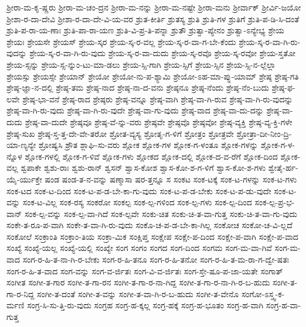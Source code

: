 {ಶ್ರೀರಾ-ಮ-ಕೃ-ಷ್ಣರು
ಶ್ರೀರಾ-ಮ-ಚಂ-ದ್ರನ
ಶ್ರೀರಾ-ಮ-ನನ್ನು
ಶ್ರೀರಾ-ಮ-ನಷ್ಟೇ
ಶ್ರೀರಾ-ಮನು
ಶ್ರೀರ್ವಾಕ್
ಶ್ರೀರ್ವಿ-ಜಯೋ
ಶ್ರೀಶಾ-ರ-ದಾ-ದೇವಿ
ಶ್ರೀಶಾ-ರ-ದಾ-ದೇ-ವಿ-ಯ-ವರ
ಶ್ರುತ-ಕೀರ್ತಿ
ಶ್ರುತಸ್ಯ
ಶ್ರುತಿ
ಶ್ರುತಿ-ಗಳ
ಶ್ರುತಿಗೆ
ಶ್ರುತಿ-ಪ-ಡಿ-ಸಿ-ದಂತೆ
ಶ್ರುತಿ-ಪ-ರಾ-ಯ-ಣಾಃ
ಶ್ರುತಿ-ಪಾ-ರಾ-ಯಣ
ಶ್ರುತಿ-ವಿ-ಪ್ರ-ತಿ-ಪನ್ನಾ
ಶ್ರುತೌ
ಶ್ರುತ್ವಾ-ಪ್ಯೇನಂ
ಶ್ರುತ್ವಾ-ಽನ್ಯೇಭ್ಯ
ಶ್ರೇಯ
ಶ್ರೇಯಃ
ಶ್ರೇಯಸೇ
ಶ್ರೇಯಸ್
ಶ್ರೇಯ-ಸ್ಕರ
ಶ್ರೇಯ-ಸ್ಕ-ರ-ವಲ್ಲ
ಶ್ರೇಯ-ಸ್ಕ-ರ-ವಾ-ಗ-ಬೇ-ಕೆಂದು
ಶ್ರೇಯ-ಸ್ಕ-ರ-ವಾ-ಗಿ-ರು-ವುದನ್ನು
ಶ್ರೇಯ-ಸ್ಕ-ರ-ವಾ-ಗಿ-ರು-ವುದು
ಶ್ರೇಯ-ಸ್ಕ-ರ-ವಾ-ದುದು
ಶ್ರೇಯ-ಸ್ಕ-ರವೊ
ಶ್ರೇಯ-ಸ್ಕ-ರವೋ
ಶ್ರೇಯ-ಸ್ತತೋ
ಶ್ರೇಯ-ಸ್ಸನ್ನು
ಶ್ರೇಯ-ಸ್ಸ-ನ್ನುಂ-ಟು-ಮಾ-ಡಲು
ಶ್ರೇಯ-ಸ್ಸಿ-ಗಾಗಿ
ಶ್ರೇಯ-ಸ್ಸಿಗೆ
ಶ್ರೇಯ-ಸ್ಸಿನ
ಶ್ರೇಯ-ಸ್ಸಿ-ನ-ಲ್ಲೆಲ್ಲಾ
ಶ್ರೇಯಸ್ಸು
ಶ್ರೇಯಸ್ಸೇ
ಶ್ರೇಯಾನ್
ಶ್ರೇಯೋ
ಶ್ರೇಯೋ-ನು-ಪ-ಶ್ಯಾಮಿ
ಶ್ರೇಯೋ-ಽಹ-ಮಾ-ಪ್ನು-ಯಾಮ್
ಶ್ರೇಷ್ಠ
ಶ್ರೇಷ್ಠ-ಗತಿ
ಶ್ರೇಷ್ಠ-ಜ್ಞಾ-ನ-ದಲ್ಲಿ
ಶ್ರೇಷ್ಠ-ತಮ
ಶ್ರೇಷ್ಠ-ನಾದ
ಶ್ರೇಷ್ಠ-ನಾ-ದ-ವನು
ಶ್ರೇಷ್ಠನೂ
ಶ್ರೇಷ್ಠ-ನೆಂದು
ಶ್ರೇಷ್ಠ-ನೆಂ-ಬುದು
ಶ್ರೇಷ್ಠ-ಫ-ಲವೇ
ಶ್ರೇಷ್ಠ-ಭಾ-ವನೆ
ಶ್ರೇಷ್ಠ-ರಾದ
ಶ್ರೇಷ್ಠರು
ಶ್ರೇಷ್ಠ-ವನ್ನೂ
ಶ್ರೇಷ್ಠ-ವಾಗಿ
ಶ್ರೇಷ್ಠ-ವಾ-ಗಿ-ರುವ
ಶ್ರೇಷ್ಠ-ವಾ-ಗಿ-ರು-ವುದನ್ನು
ಶ್ರೇಷ್ಠ-ವಾ-ಗಿ-ರು-ವುದು
ಶ್ರೇಷ್ಠ-ವಾ-ಗಿ-ರು-ವುದೇ
ಶ್ರೇಷ್ಠ-ವಾ-ಗು-ವುದು
ಶ್ರೇಷ್ಠ-ವಾದ
ಶ್ರೇಷ್ಠ-ವಾ-ದು-ದನ್ನು
ಶ್ರೇಷ್ಠ-ವಾ-ದುದು
ಶ್ರೇಷ್ಠ-ವಾ-ದುದೇ
ಶ್ರೇಷ್ಠವೂ
ಶ್ರೇಷ್ಠ-ವೆ-ನ್ನು-ವರು
ಶ್ರೇಷ್ಠವೇ
ಶ್ರೇಷ್ಠವೊ
ಶ್ರೇಷ್ಠವೋ
ಶ್ರೇಷ್ಠ-ವ್ಯಕ್ತಿ
ಶ್ರೇಷ್ಠ-ವ್ಯ-ಕ್ತಿ-ಗಳೇ
ಶ್ರೇಷ್ಠ-ಸುಖ
ಶ್ರೇಷ್ಠ-ಸ್ತ-ತ್ತ-ದೇ-ವೇ-ತರೋ
ಶ್ರೋತ-ವ್ಯಸ್ಯ
ಶ್ರೋತೃ-ಗ-ಳಿಗೆ
ಶ್ರೋತ್ರಂ
ಶ್ರೋತ್ರವೇ
ಶ್ರೋತ್ರಾ-ದೀ-ನೀಂ-ದ್ರಿ-ಯಾ-ಣ್ಯನ್ಯೇ
ಶ್ರೋಷ್ಯಸಿ
ಶ್ರೌತ
ಶ್ಲಾಘಿ-ಸು-ವರು
ಶ್ಲೋಕ
ಶ್ಲೋಕ-ಗಳ
ಶ್ಲೋಕ-ಗ-ಳಂತೂ
ಶ್ಲೋಕ-ಗಳನ್ನು
ಶ್ಲೋಕ-ಗ-ಳ-ನ್ನೊಳ
ಶ್ಲೋಕ-ಗಳಲ್ಲಿ
ಶ್ಲೋಕ-ಗ-ಳಿವೆ
ಶ್ಲೋಕ-ಗಳು
ಶ್ಲೋಕದ
ಶ್ಲೋಕ-ದಲ್ಲಿ
ಶ್ಲೋಕ-ದ-ವ-ರೆಗೆ
ಶ್ಲೋಕ-ದಿಂದ
ಶ್ಲೋಕ-ವಲ್ಲ
ಶ್ವಪಾಕೇ
ಶ್ವಶು-ರಾಃ
ಶ್ವಶು-ರಾನ್
ಶ್ವಸನ್
ಶ್ವಾಸ-ಕೋಶ
ಶ್ವಾಸ-ಕೋ-ಶ-ಗ-ಳಿಗೆ
ಶ್ವಾಸ-ಕೋ-ಶ-ಗಳು
ಶ್ವೇತೈ-ರ್ಹ-ಯೈ-ರ್ಯುಕ್ತೇ
ಷಂಡ
ಷಂಡ-ತ-ನ-ವನ್ನು
ಷಣ್ಮಾಸಾ
ಷರ-ತ್ತನ್ನೂ
ಸ
ಸಂಕಟ
ಸಂಕ-ಟಕ್ಕೆ
ಸಂಕ-ಟ-ಗಳನ್ನು
ಸಂಕ-ಟ-ಗಳು
ಸಂಕ-ಟದ
ಸಂಕ-ಟ-ದಿಂದ
ಸಂಕ-ಟ-ಪ-ಡ-ಬೇ-ಕಾ-ಗು-ವುದು
ಸಂಕ-ಟ-ಪ-ಡ-ಬೇಕು
ಸಂಕ-ಟ-ಪ-ಡು-ವುದೇ
ಸಂಕ-ಟ-ವನ್ನು
ಸಂಕ-ಟ-ವಿಲ್ಲ
ಸಂಕ-ರಸ್ಯ
ಸಂಕರೋ
ಸಂಕಲ್ಪ
ಸಂಕ-ಲ್ಪ-ಗಳಿಂದ
ಸಂಕ-ಲ್ಪ-ಗಳು
ಸಂಕ-ಲ್ಪ-ದಿಂದ
ಸಂಕ-ಲ್ಪ-ಪ್ರ-ಭ-ವಾನ್
ಸಂಕ-ಲ್ಪ-ವನ್ನು
ಸಂಕ-ಲ್ಪ-ವಾ-ಗಿದೆ
ಸಂಕ-ಲ್ಪವೇ
ಸಂಕು-ಚಿತ
ಸಂಕು-ಚಿ-ತ-ವಾ-ಗುತ್ತ
ಸಂಕು-ಚಿ-ತ-ವಾ-ಗು-ವುದು
ಸಂಕೇ-ತ-ರೂ-ಪ-ವಾಗಿ
ಸಂಕೇ-ತ-ವಾ-ಗಿ-ರು-ವುದು
ಸಂಕೊ-ಚ-ಪ-ಡ-ಬೇ-ಕಾ-ಗಿಲ್ಲ
ಸಂಕೋಚ
ಸಂಕೋ-ಚ-ವಿ-ಲ್ಲದೆ
ಸಂಕೋಲೆ
ಸಂಕ್ರಾಂತಿ
ಸಂಕ್ರಾಂ-ತಿಯ
ಸಂಕ್ರಾ-ಮಿಕ
ಸಂಕ್ಷಿಪ್ತ
ಸಂಕ್ಷೇಪ
ಸಂಕ್ಷೇ-ಪ-ದಿಂದ
ಸಂಕ್ಷೇ-ಪ-ವಾಗಿ
ಸಂಕ್ಷೇ-ಪ-ವಾದ
ಸಂಖ್ಯೆ
ಸಂಖ್ಯೆ-ಯಲ್ಲ
ಸಂಖ್ಯೆ-ಯಲ್ಲಿ
ಸಂಖ್ಯೇ
ಸಂಗ
ಸಂಗಂ
ಸಂಗದ
ಸಂಗ-ದಿಂದ
ಸಂಗಮ
ಸಂಗ-ಮ-ವಾ-ಗಿವೆ
ಸಂಗ-ಮ-ವಾದ
ಸಂಗ-ರ-ಹಿ-ತ-ನಾ-ಗಿ-ರ-ಬೇಕು
ಸಂಗ-ರ-ಹಿ-ತನೂ
ಸಂಗ-ರ-ಹಿ-ತನೋ
ಸಂಗ-ರ-ಹಿ-ತ-ಮ-ರಾ-ಗ-ದ್ವೇ-ಷತಃ
ಸಂಗ-ರ-ಹಿ-ತ-ವಾದ
ಸಂಗ-ವನ್ನು
ಸಂಗ-ವ-ರ್ಜಿತಃ
ಸಂಗ-ವಿ-ವ-ರ್ಜಿತಃ
ಸಂಗ-ಸ್ತೇ-ಷೂ-ಪ-ಜಾ-ಯತೇ
ಸಂಗಾತ್
ಸಂಗೀತ
ಸಂಗೀ-ತ-ಗಾರ
ಸಂಗೀ-ತ-ಗಾ-ರನ
ಸಂಗೀ-ತ-ಗಾ-ರ-ನಾ-ಗಿದ್ದ
ಸಂಗೀ-ತ-ಗಾ-ರ-ನಾ-ಗಿ-ರ-ಬ-ಹುದು
ಸಂಗೀ-ತ-ಗಾ-ರ-ನಿದ್ದ
ಸಂಗೀ-ತ-ದಂತೆ
ಸಂಗೀ-ತ-ವನ್ನು
ಸಂಗೀ-ತ-ವಾ-ಗಿ-ರ-ಬ-ಹುದು
ಸಂಗೀ-ತ-ವೇನೊ
ಸಂಗೋ-ಽಸ್ತ್ವ-ಕ-ರ್ಮಣಿ
ಸಂಗ್ರ-ಸಿ-ಸು-ತ್ತಿ-ರು-ವುದು
ಸಂಗ್ರಹ
ಸಂಗ್ರ-ಹ-ಕ್ಕಲ್ಲ
ಸಂಗ್ರ-ಹಕ್ಕೆ
ಸಂಗ್ರ-ಹ-ಭೂತಂ
ಸಂಗ್ರ-ಹ-ವಾಗಿ
ಸಂಗ್ರ-ಹ-ವಾ-ಗುತ್ತ
}
